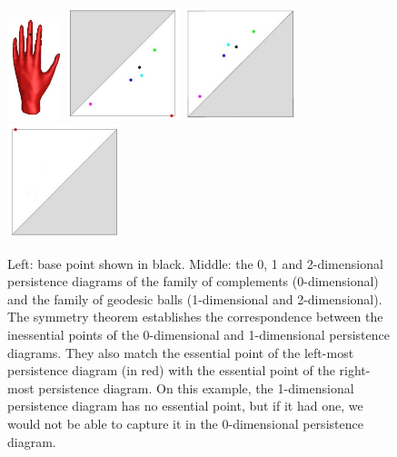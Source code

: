 %
\begin{figure}[t!] 
\begin{center}
\includegraphics[height = 3cm]{figures/dist6}\hspace{3mm}
\includegraphics[height = 3.3cm]{figures/PD1} 
\includegraphics[height = 3.3cm]{figures/PD3} 
\includegraphics[height = 3.3cm]{figures/PD4}  
\caption[Symmetry]{\label{fig:dual} Left: base point shown in black. Middle: the 0, 1 and 2-dimensional
  persistence diagrams of the family of complements (0-dimensional) and the family of geodesic balls (1-dimensional and
  2-dimensional).  The symmetry theorem establishes the correspondence between the inessential points of the 0-dimensional
  and 1-dimensional persistence diagrams. They also match the essential point of the left-most persistence diagram (in red) with the
  essential point of the right-most persistence diagram. On this example, the 1-dimensional persistence diagram has no essential
  point, but if it had one, we would not be able to capture it in the 0-dimensional persistence diagram.}
\end{center} 
\end{figure}


